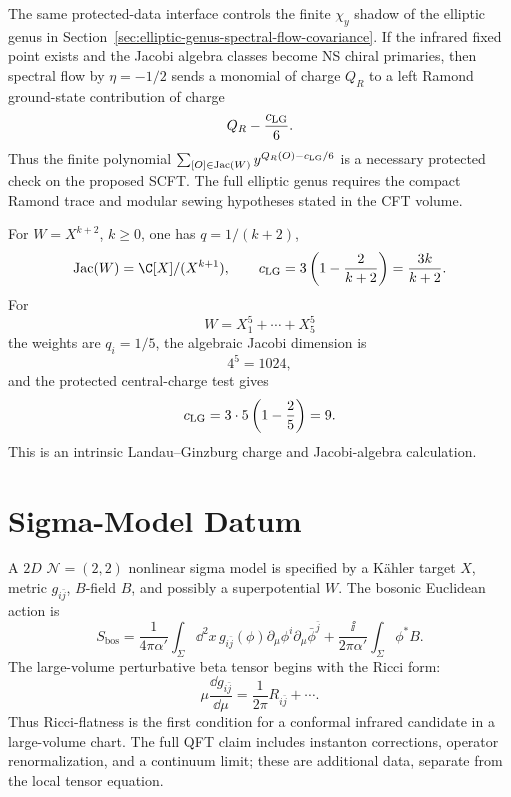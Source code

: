 The same protected-data interface controls the finite \(\chi_y\) shadow of
the elliptic genus in
Section~\ref{sec:elliptic-genus-spectral-flow-covariance}.  If the infrared
fixed point exists and the Jacobi algebra classes become NS chiral primaries,
then spectral flow by \(\eta=-1/2\) sends a monomial of charge \(Q_R\) to a
left Ramond ground-state contribution of charge
\begin{equation}
  Q_R-\frac{c_{\rm LG}}6 .
  \label{eq:vii-lg-ramond-charge-shift}
\end{equation}
Thus the finite polynomial \(\sum_{[O]\in\operatorname{Jac}(W)}
y^{Q_R(O)-c_{\rm LG}/6}\) is a necessary protected check on the proposed
SCFT.  The full elliptic genus requires the compact Ramond trace and modular
sewing hypotheses stated in the CFT volume.

\begin{example}
\label{ex:vii-lg-a-series-quintic-checks}
For \(W=X^{k+2}\), \(k\geq0\), one has \(q=1/(k+2)\),
\[
  \operatorname{Jac}(W)=\C[X]/(X^{k+1}),
  \qquad
  c_{\rm LG}=3\left(1-\frac{2}{k+2}\right)=\frac{3k}{k+2}.
\]
For
\[
  W=X_1^5+\cdots+X_5^5
\]
the weights are \(q_i=1/5\), the algebraic Jacobi dimension is
\[
  4^5=1024,
\]
and the protected central-charge test gives
\[
  c_{\rm LG}=3\cdot5\left(1-\frac25\right)=9.
\]
This is an intrinsic Landau--Ginzburg charge and Jacobi-algebra calculation.
\end{example}

\section{Sigma-Model Datum}

A \(2D\) \(\mathcal N=(2,2)\) nonlinear sigma model is specified by a K\"ahler
target \(X\), metric \(g_{i\bar j}\), \(B\)-field \(B\), and possibly a
superpotential \(W\).  The bosonic Euclidean action is
\[
  S_{\mathrm{bos}}
  =
  \frac1{4\pi\alpha'}
  \int_\Sigma
  \dd^2x\,
  g_{i\bar j}(\phi)\partial_\mu\phi^i\partial_\mu\bar\phi^{\bar j}
  +
  \frac{\ii}{2\pi\alpha'}
  \int_\Sigma \phi^*B .
\]
The large-volume perturbative beta tensor begins with the Ricci form:
\[
  \mu\frac{\dd g_{i\bar j}}{\dd\mu}
  =
  \frac1{2\pi}R_{i\bar j}+\cdots .
\]
Thus Ricci-flatness is the first condition for a conformal infrared candidate
in a large-volume chart.  The full QFT claim includes instanton corrections,
operator renormalization, and a continuum limit; these are additional data,
separate from the local tensor equation.

